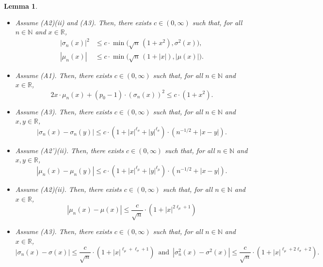 \documentclass[11pt]{amsart}
\newcommand{\R}{{\mathbb R}}
\newcommand{\N}{{\mathbb N}}
\theoremstyle{plain}
\newtheorem{lemma}{Lemma}
\theoremstyle{definition}
\begin{document}
\begin{lemma}\label{tamedcoeff1}\mbox{}\\[-.5cm]
	\begin{itemize}
		\item[(i)] Assume (A2)(ii) and (A3). Then, there exists $c\in (0,\infty)$ such that, for all $n\in\N$ and $x\in\R$,
\begin{equation}
\begin{aligned}\label{tmg004}
|\sigma_n(x)|^2 & \le c\cdot\min\bigl(\sqrt{n}\,(1+x^2),\sigma^2(x)\bigr),\\
|\mu_n(x)| & \le c\cdot\min\bigl(\sqrt{n}\,(1+|x|),|\mu(x)|\bigr).
\end{aligned}
\end{equation}
	\item[(ii)] Assume (A1). Then, there exists $c\in (0,\infty)$ such that, for all $n\in\N$ and $x\in\R$,
\begin{equation}\label{tmg005}
2x\cdot\mu_n(x) + (p_0-1)\cdot (\sigma_n(x))^2 \le c\cdot (1+x^2).
\end{equation}
	\item[(iii)] Assume (A3).
Then, there exists $c\in (0,\infty)$ such that, for all $n\in\N$ and $x,y\in\R$,
\begin{equation}\label{tmg0005}
|\sigma_n(x) -\sigma_n(y)| \le c\cdot   (1+ |x|^{\ell_\sigma} + |y|^{\ell_\sigma})\cdot (n^{-1/2} +|x-y|).
\end{equation}
\item[(iv)] Assume (A2')(ii).
Then, there exists $c\in (0,\infty)$ such that, for all $n\in\N$ and $x,y\in\R$,
\begin{equation}\label{tmg0006}
	|\mu_n(x) -\mu_n(y)| \le c\cdot   (1+ |x|^{\ell_\mu} + |y|^{\ell_\mu})\cdot (n^{-1/2} +|x-y|).
	\end{equation}
\item[(v)] Assume (A2)(ii). Then, there exists $c\in (0,\infty)$ such that, for all $n\in\N$ and $x\in\R$,
\begin{equation}\label{tmg0007}
	|\mu_n(x) -\mu(x)| \le \frac{c}{\sqrt{n}} \cdot   (1+ |x|^{2\ell_\mu+1})
\end{equation}
\item[(vi)] Assume (A3). Then, there exists $c\in (0,\infty)$ such that, for all $n\in\N$ and $x\in\R$,
\begin{equation}\label{tmg0008}
	|\sigma_n(x) -\sigma(x)| \le \frac{c}{\sqrt{n}} \cdot   (1+ |x|^{\ell_\mu+\ell_\sigma + 1})\,\text{ and }\, 	|\sigma^2_n(x) -\sigma^2(x)| \le \frac{c}{\sqrt{n}} \cdot   (1+ |x|^{\ell_\mu+2\ell_\sigma + 2}).
\end{equation}
	\end{itemize}
\end{lemma}
\end{document}
